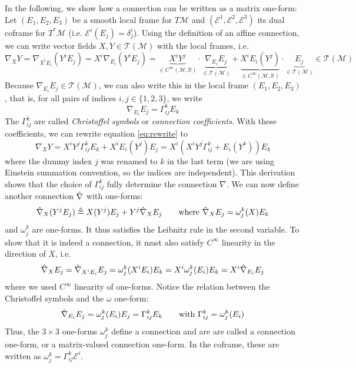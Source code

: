 \documentclass[../thesis.tex]{subfiles}
\begin{document}
In the following, we show how a connection can be written as a matrix one-form:
Let $(E_1, E_2, E_3)$ be a smooth local frame for $T\mathcal{M}$ and
$(\mathcal{E}^1, \mathcal{E}^2, \mathcal{E}^3)$ its dual coframe for
$T^*\mathcal{M}$ (i.e. $\mathcal{E}^i(E_j)=\delta^i_j$).
Using the definition of an affine connection, we can write
vector fields $X,Y \in \mathcal{T}(\mathcal{M})$ with the local frames, i.e.
\begin{equation}\label{eq:rewrite}
  \nabla_XY = \nabla_{X^iE_i}(Y^iE_j) = X^i\nabla_{E_i}(Y^iE_j)
  = \underbrace{X^iY^j}_{\in C^{\infty}(\mathcal{M}, \mathbb{R})} \cdot \underbrace{\nabla_{E_i}E_j}_{\in \mathcal{T}(\mathcal{M})} + \underbrace{X^iE_i(Y^j)}_{\in C^{\infty}(\mathcal{M}, \mathbb{R})}\cdot \underbrace{E_j}_{\in \mathcal{T}(\mathcal{M})} \in \mathcal{T}(\mathcal{M})
\end{equation}
Because $\nabla_{E_i}E_j \in \mathcal{T}(\mathcal{M})$, we can also write this in the local frame $(E_1, E_2, E_3)$,
that is, for all pairs of indices $i,j \in \{1,2,3\}$, we write
$$\nabla_{E_i}E_j = \Gamma_{ij}^kE_k$$
The $\Gamma_{ij}^k$ are called \emph{Christoffel symbols} or \emph{connection coefficients}.
With these coefficients, we can rewrite equation \ref{eq:rewrite} to 
\begin{equation}
  \nabla_XY = X^iY^j \Gamma_{ij}^kE_k + X^iE_i(Y^j) E_j = X^i(X^iY^j\Gamma_{ij}^k + E_i(Y^k))E_k
\end{equation}
where the dummy index $j$ was renamed to $k$ in the last term (we are using Einstein summation convention, so the indices are independent).
This derivation shows that the choice of $\Gamma_{ij}^k$ fully determine the connection $\nabla$.
We can now define another connection $\Hat{\nabla}$ with one-forms:
\begin{equation}
  \Hat{\nabla}_X (Y^jE_j) \triangleq X(Y^j)E_j + Y^j \Hat{\nabla}_X E_j \qquad \text{where } \Hat{\nabla}_XE_j = \omega_j^k(X)E_k
\end{equation}
and $\omega_j^k$ are one-forms. It thus satisfies the Leibnitz rule in the second variable.
To show that it is indeed a connection, it must also satisfy $C^{\infty}$ linearity in the direction of $X$, i.e.
\begin{equation}
  \Hat{\nabla}_XE_j = \Hat{\nabla}_{X^iE_i}E_j = \omega_j^k(X^iE_i)E_k = X^i\omega_j^k(E_i)E_k = X^i \Hat{\nabla}_{E_i}E_j
\end{equation}
where we used $C^{\infty}$ linearity of one-forms. Notice the relation between
the Christoffel symbols and the $\omega$ one-form:
$$\Hat{\nabla}_{E_i}E_j = \omega_j^k(E_i)E_j = \Gamma_{ij}^kE_k \qquad \text{with }\Gamma_{ij}^k=\omega_j^k(E_i)$$
Thus, the $3\times3$ one-forms $\omega_j^k$ define a connection and are
are called a connection one-form, or a matrix-valued connection one-form. In the coframe, these are written as $\omega_j^k = \Gamma_{ij}^k \mathcal{E}^i$.
\end{document}
